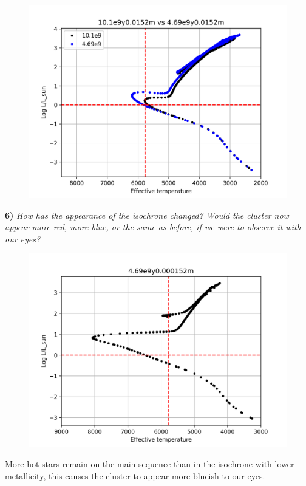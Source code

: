 \documentclass[11pt,a4paper]{article}
\begin{document}
    \begin{figure}[h]
        \centering
        \includegraphics[width=12cm]{figures/4.69e9_vs_10.1e9y}
        \label{fig:deathOfTheSun}
    \end{figure}
    \newpage

    \textbf{6)} \textit{How has the appearance of the isochrone changed?
    Would the cluster now appear more red, more blue, or the same as before, if we were to observe it with our eyes?}

    \begin{figure}[h]
        \centering
        \includegraphics[width=12cm]{figures/4.69e9y0.000152m}
        \label{fig:highMetal}
    \end{figure}

    More hot stars remain on the main sequence than in the isochrone with lower metallicity, this causes the cluster to appear more blueish to our eyes.
    
\end{document}
